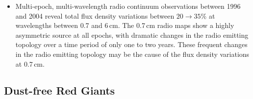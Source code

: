 \begin{itemize}
\item Multi-epoch, multi-wavelength radio continuum observations between 1996 and 2004 reveal total flux density variations between $20\rightarrow 35\%$ at wavelengths between 0.7 and 6\,cm. The 0.7\,cm radio maps show a highly asymmetric source at all epochs, with dramatic changes in the radio emitting topology over a time period of only one to two years. These frequent changes in the radio emitting topology may be the cause of the flux density variations at 0.7\,cm.
  
\end{itemize}

\subsection{Dust-free Red Giants}\label{sec:8.1.2}

